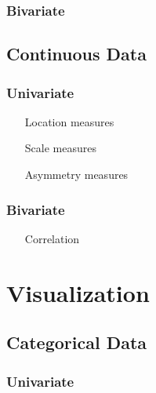 \documentclass[12pt,a4paper]{report}
\begin{document}
\subsubsection{Bivariate}



\subsection{Continuous Data}

\subsubsection{Univariate}

\begin{enumerate}
\item[Location measures]

\item[Scale measures]

\item[Asymmetry measures]

\end{enumerate}


\subsubsection{Bivariate}
\begin{enumerate}
\item[Correlation]
\end{enumerate}










\section{Visualization}

\subsection{Categorical Data}

\subsubsection{Univariate}
\end{document}
